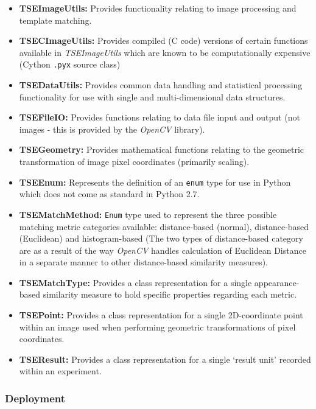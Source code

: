 \begin{itemize}
	\item \textbf{TSEImageUtils:} Provides functionality relating to image processing and template matching.
	\item \textbf{TSECImageUtils:} Provides compiled (C code) versions of certain functions available in \textit{TSEImageUtils} which are known to be computationally expensive (Cython \texttt{.pyx} source class)
	\item \textbf{TSEDataUtils:} Provides common data handling and statistical processing functionality for use with single and multi-dimensional data structures.
	\item \textbf{TSEFileIO:} Provides functions relating to data file input and output (not images - this is provided by the \textit{OpenCV} library).
	\item \textbf{TSEGeometry:} Provides mathematical functions relating to the geometric transformation of image pixel coordinates (primarily scaling).
	\item \textbf{TSEEnum:} Represents the definition of an \texttt{enum} type for use in Python which does not come as standard in Python 2.7.
	\item \textbf{TSEMatchMethod:} \texttt{Enum} type used to represent the three possible matching metric categories available: distance-based (normal), distance-based (Euclidean) and histogram-based (The two types of distance-based category are as a result of the way \textit{OpenCV} handles calculation of Euclidean Distance in a separate manner to other distance-based similarity measures).
	\item \textbf{TSEMatchType:} Provides a class representation for a single appearance-based similarity measure to hold specific properties regarding each metric.
	\item \textbf{TSEPoint:} Provides a class representation for a single 2D-coordinate point within an image used when performing geometric transformations of pixel coordinates.
	\item \textbf{TSEResult:} Provides a class representation for a single `result unit' recorded within an experiment.
\end{itemize}


\subsubsection{Deployment}

